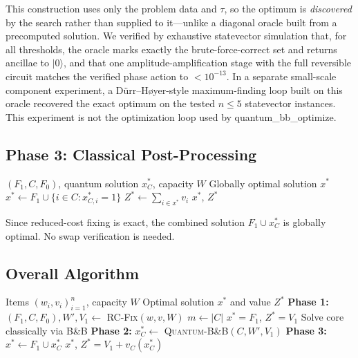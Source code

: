 \documentclass[conference]{IEEEtran} \IEEEoverridecommandlockouts
\begin{document}
This construction uses only the problem data and $\tau$, so the optimum is \textit{discovered} by the search rather than supplied to it---unlike a diagonal oracle built from a precomputed solution. We verified by exhaustive statevector simulation that, for all thresholds, the oracle marks exactly the brute-force-correct set and returns ancillae to $|0\rangle$, and that one amplitude-amplification stage with the full reversible circuit matches the verified phase action to $<10^{-13}$. In a separate small-scale component experiment, a D\"urr--H{\o}yer-style maximum-finding loop built on this oracle recovered the exact optimum on the tested $n \le 5$ statevector instances. This experiment is not the optimization loop used by quantum\_bb\_optimize.

\subsection{Phase 3: Classical Post-Processing}

\begin{algorithm}[h]
\caption{Classical Reconstruction}
\label{alg:postprocess}
\begin{algorithmic}[1]
\REQUIRE $(F_1, C, F_0)$, quantum solution $x^*_C$, capacity $W$
\ENSURE Globally optimal solution $x^*$
\STATE $x^* \leftarrow F_1 \cup \{i \in C : x^*_{C,i} = 1\}$
\STATE $Z^* \leftarrow \sum_{i \in x^*} v_i$
\RETURN $x^*$, $Z^*$
\end{algorithmic}
\end{algorithm}

Since reduced-cost fixing is exact, the combined solution $F_1 \cup x^*_C$ is globally optimal. No swap verification is needed.

\subsection{Overall Algorithm}

\begin{algorithm}[h]
\caption{LP-Pruned Quantum B\&B Knapsack Solver}
\label{alg:hybrid}
\begin{algorithmic}[1]
\REQUIRE Items $(w_i, v_i)_{i=1}^n$, capacity $W$
\ENSURE Optimal solution $x^*$ and value $Z^*$
\STATE \textbf{Phase 1:} $(F_1, C, F_0), W', V_1 \leftarrow$ \textsc{RC-Fix}$(w, v, W)$ 
\STATE $m \leftarrow |C|$
    \RETURN $x^* = F_1$, $Z^* = V_1$
    \STATE Solve core classically via B\&B
\ELSE
    \STATE \textbf{Phase 2:} $x^*_C \leftarrow$ \textsc{Quantum-B\&B}$(C, W', V_1)$ 
\ENDIF
\STATE \textbf{Phase 3:} $x^* \leftarrow F_1 \cup x^*_C$
\RETURN $x^*$, $Z^* = V_1 + v_C(x^*_C)$
\end{algorithmic}
\end{algorithm}
\end{document}
